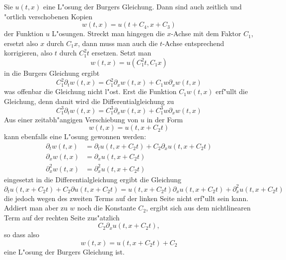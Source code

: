 Sie $u(t,x)$ eine L"osung der Burgers Gleichung. Dann sind auch
zeitlich und "ortlich verschobenen Kopien
$$w(t,x)=u(t+C_4, x+C_3)$$
der Funktion $u$ L"osungen.
Streckt man hingegen die $x$-Achse mit dem Faktor $C_1$, ersetzt
also $x$ durch $C_1x$, dann
muss man auch die $t$-Achse entsprechend korrigieren, also $t$
durch $C_1^2t$ ersetzen. Setzt man
$$
w(t,x)=u(C_1^2t,C_1x)
$$
in die Burgers Gleichung ergibt
$$
C_1^2\partial_t w(t,x)=C_1^2\partial_xw(t,x)+C_1w\partial_xw(t,x)
$$
was offenbar die Gleichung nicht l"ost. Erst die Funktion $C_1w(t,x)$
erf"ullt die Gleichung, denn damit wird die Differentialgleichung zu
$$
C_1^3\partial_t w(t,x)=C_1^3\partial_xw(t,x)+C_1^3w\partial_xw(t,x)
$$
Aus einer zeitabh"angigen Verschiebung von $u$ in der Form
$$w(t,x)=u(t,x+C_2t)$$
kann ebenfalls eine L"osung gewonnen werden:
\begin{align*}
\partial_t w(t,x)&=\partial_t u(t,x+C_2t)+C_2\partial_x u(t,x+C_2t)
\\
\partial_x w(t,x)&=\partial_x u(t,x+C_2t)
\\
\partial_x^2 w(t,x)&=\partial_x^2 u(t,x+C_2t)
\end{align*}
eingesetzt in die Differentialgleichung ergibt die Gleichung
$$
\partial_t u(t,x+C_2t)+C_2\partial u(t,x+C_2t)
=
u(t,x+C_2t)\partial_xu(t,x+C_2t)
+
\partial_x^2 u(t,x+C_2t)
$$
die jedoch wegen des zweiten Terms auf der linken Seite nicht erf"ullt
sein kann. Addiert man aber zu $w$ noch die Konstante $C_2$, ergibt sich
aus dem nichtlinearen Term auf der rechten Seite zus"atzlich
$$C_2\partial_xu(t,x+C_2t),$$
so dass also
$$w(t,x)=u(t,x+C_2t)+C_2$$
eine L"osung der Burgers Gleichung ist.


